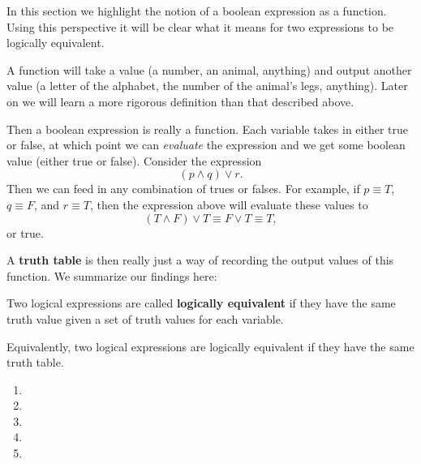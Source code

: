 In this section we highlight the notion of a boolean expression as a function. Using this perspective it will be clear what it means for two expressions to be logically equivalent. 

\begin{tcolorbox}
A function will take a value (a number, an animal, anything) and output another value (a letter of the alphabet, the number of the animal's legs, anything). Later on we will learn a more rigorous definition than that described above.
\end{tcolorbox}

Then a boolean expression is really a function. Each variable takes in either true or false, at which point we can \textit{evaluate} the expression and we get some boolean value (either true or false). Consider the expression
\[(p \land q) \lor r.\]
Then we can feed in any combination of trues or falses. For example, if $p \equiv T$, $q \equiv F$, and $r \equiv T$, then the expression above will evaluate these values to 
\[(T \land F) \lor T \equiv F \lor T \equiv T,\] or true.

A \textbf{truth table} is then really just a way of recording the output values of this function. We summarize our findings here:
\begin{tcolorbox}
Two logical expressions are called \textbf{logically equivalent} if they have the same truth value given a set of truth values for each variable.

Equivalently, two logical expressions are logically equivalent if they have the same truth table.
\end{tcolorbox}

 \begin{enumerate}
   \item 
    \item 
    \item 
    \item 
    \item 
 \end{enumerate}
